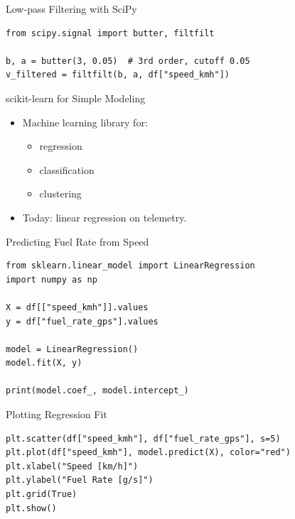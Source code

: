 \documentclass[aspectratio=169]{beamer}
\begin{document}
\begin{frame}[fragile]{Low-pass Filtering with SciPy}
\begin{verbatim}
from scipy.signal import butter, filtfilt

b, a = butter(3, 0.05)  # 3rd order, cutoff 0.05
v_filtered = filtfilt(b, a, df["speed_kmh"])
\end{verbatim}
\end{frame}

\begin{frame}{scikit-learn for Simple Modeling}
  \begin{itemize}
    \item Machine learning library for:
      \begin{itemize}
        \item regression
        \item classification
        \item clustering
      \end{itemize}
    \item Today: linear regression on telemetry.
  \end{itemize}
\end{frame}

\begin{frame}[fragile]{Predicting Fuel Rate from Speed}
\begin{verbatim}
from sklearn.linear_model import LinearRegression
import numpy as np

X = df[["speed_kmh"]].values
y = df["fuel_rate_gps"].values

model = LinearRegression()
model.fit(X, y)

print(model.coef_, model.intercept_)
\end{verbatim}
\end{frame}

\begin{frame}[fragile]{Plotting Regression Fit}
\begin{verbatim}
plt.scatter(df["speed_kmh"], df["fuel_rate_gps"], s=5)
plt.plot(df["speed_kmh"], model.predict(X), color="red")
plt.xlabel("Speed [km/h]")
plt.ylabel("Fuel Rate [g/s]")
plt.grid(True)
plt.show()
\end{verbatim}
\end{frame}
\end{document}
